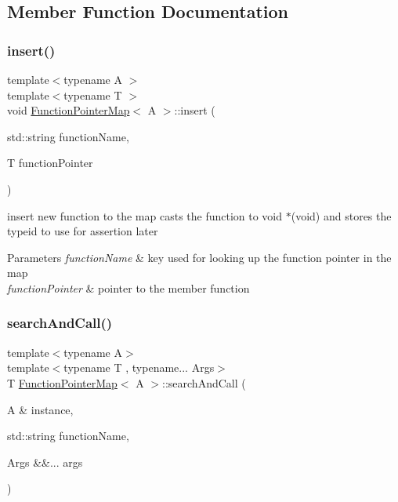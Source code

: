 \subsection{Member Function Documentation}
\mbox{\label{classFunctionPointerMap_af750cbe11e423835a4d456aebc1af7e8}} 
\subsubsection{\texorpdfstring{insert()}{insert()}}
{\footnotesize\ttfamily template$<$typename A $>$ \\
template$<$typename T $>$ \\
void \hyperlink{classFunctionPointerMap}{Function\+Pointer\+Map}$<$ A $>$\+::insert (\begin{DoxyParamCaption}\item[{std\+::string}]{function\+Name,  }\item[{T}]{function\+Pointer }\end{DoxyParamCaption})}

insert new function to the map casts the function to void $\ast$(void) and stores the typeid to use for assertion later 
\begin{DoxyParams}{Parameters}
{\em function\+Name} & key used for looking up the function pointer in the map \\
\hline
{\em function\+Pointer} & pointer to the member function \\
\hline
\end{DoxyParams}
\mbox{\label{classFunctionPointerMap_ae750181faa3848ddbdb76b58ae54f041}} 
\subsubsection{\texorpdfstring{search\+And\+Call()}{searchAndCall()}}
{\footnotesize\ttfamily template$<$typename A$>$ \\
template$<$typename T , typename... Args$>$ \\
T \hyperlink{classFunctionPointerMap}{Function\+Pointer\+Map}$<$ A $>$\+::search\+And\+Call (\begin{DoxyParamCaption}\item[{A \&}]{instance,  }\item[{std\+::string}]{function\+Name,  }\item[{Args \&\&...}]{args }\end{DoxyParamCaption})}

